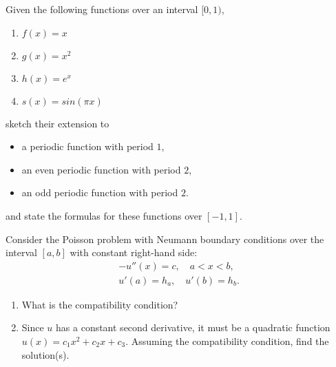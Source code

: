\documentclass[11pt]{article}
\begin{document}
\begin{exercise}
    Given the following functions over an interval $[0,1)$, 
    \begin{enumerate}[label=(\alph*)]
        \item $f(x) = x$
        \item $g(x) = x^2$
        \item $h(x) = e^x$
        \item $s(x) = sin(\pi x)$
    \end{enumerate}
    sketch their extension to 
    \begin{itemize}
        \item a periodic function with period $1$,
        \item an even periodic function with period $2$,
        \item an odd periodic function with period $2$.
    \end{itemize}
    and state the formulas for these functions over $[-1,1]$.
\end{exercise}

\begin{solution}     
\end{solution}



\begin{exercise}
    Consider the Poisson problem with Neumann boundary conditions over the interval $[a,b]$ with constant right-hand side: 
    \begin{gather*}
        - u''(x) = c, \quad a < x < b,
        \\
        u'(a) = h_a, \quad u'(b) = h_b.
    \end{gather*}
    \begin{enumerate}[label=(\alph*)]
        \item
        What is the compatibility condition?
        \item 
        Since $u$ has a constant second derivative, it must be a quadratic function $u(x) = c_1 x^2 + c_2 x + c_3$. 
        Assuming the compatibility condition, find the solution(s).
    \end{enumerate}
\end{exercise}
\begin{solution}     
\end{solution}
\end{document}
